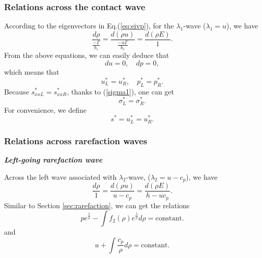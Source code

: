 \documentclass[review]{elsarticle}
\numberwithin{equation}{section}
\numberwithin{table}{section}
\begin{document}
\subsubsection{Relations across the contact wave}\label{sec:contactp}

According to  the eigenvectors in  Eq.(\ref{eq:eivp}), for the $\lambda_{1}$-wave ($\lambda_1 = u$), we
have
\begin{equation}   \label{e232a}
  \frac{d \rho}{\frac{-\Gamma}{b_1}} = \frac{d (\rho u)}{\frac{-u\Gamma}{b_1}} = \frac{d (\rho E)}{1}.
\end{equation}
From the above equations, we can easily deduce that
\begin{equation*}
  du = 0, \quad dp = 0,
\end{equation*}
which means that
\begin{equation*}
u_L^* = u_R^*, %
 \quad
  p^*_L = p^*_R.
\end{equation*}
Because $s^*_{xxL} = s^*_{xxR}$, thanks to (\ref{sigma1}), one can get
\begin{equation*}
  \sigma^*_L = \sigma^*_R.
\end{equation*}
For convenience, we define
\begin{equation*}
  s^* = u_L^* = u_R^*.
\end{equation*}

\subsubsection{Relations across rarefaction waves}

\emph{\textbf{Left-going rarefaction wave} }

Across the left wave associated with $\lambda_2$-wave, ($\lambda_2=u-c_p$), we have
\begin{equation}
  \frac{d\rho}{1} = \frac{d(\rho u)}{u-c_p} = \frac{d(\rho E)}{h-uc_p}.
\end{equation}
Similar to Section \ref{sec:rarefaction}, we can get the relations
\begin{equation}\label{eq:p_rhopL}
  p e^{\frac{\lambda}{\rho}} - \int f_2(\rho) e^{\frac{\lambda}{\rho}}d\rho = \text{constant}.
\end{equation}
and
\begin{equation}\label{eq:u_rhopL}
  u+\int\frac{c_p}{\rho} d\rho = \text{constant}.
\end{equation}
\end{document}
